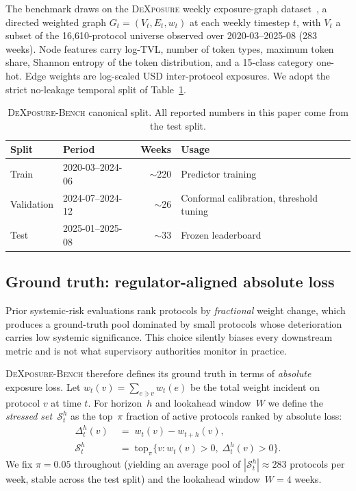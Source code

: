 The benchmark draws on the \textsc{DeXposure} weekly exposure-graph
dataset~\cite{wu2025dexposuredatasetbenchmarksinterprotocol}, a
directed weighted graph $G_t = (V_t, E_t, w_t)$ at each weekly
timestep $t$, with $V_t$ a subset of the 16{,}610-protocol universe
observed over 2020-03--2025-08 (283 weeks).  Node features carry
log-TVL, number of token types, maximum token share, Shannon entropy
of the token distribution, and a 15-class category one-hot.  Edge
weights are log-scaled USD inter-protocol exposures.  We adopt the
strict no-leakage temporal split of Table~\ref{tab:bench-split}.

\begin{table}[t]
\centering
\caption{\textsc{DeXposure-Bench} canonical split.  All reported
numbers in this paper come from the test split.}
\label{tab:bench-split}
\footnotesize
\setlength{\tabcolsep}{6pt}
\begin{tabularx}{\linewidth}{@{}llrX@{}}
\toprule
Split & Period & Weeks & Usage \\
\midrule
Train       & 2020-03--2024-06 & $\sim$220 & Predictor training \\
Validation  & 2024-07--2024-12 & $\sim$26  & Conformal calibration, threshold tuning \\
Test        & 2025-01--2025-08 & $\sim$33  & Frozen leaderboard \\
\bottomrule
\end{tabularx}
\end{table}

\subsection{Ground truth: regulator-aligned absolute loss}
\label{ssec:ground-truth}

Prior systemic-risk evaluations rank protocols by \emph{fractional}
weight change, which produces a ground-truth pool dominated by small
protocols whose deterioration carries low systemic significance.  This
choice silently biases every downstream metric and is not what
supervisory authorities monitor in practice.

\textsc{DeXposure-Bench} therefore defines its ground truth in terms
of \emph{absolute} exposure loss.  Let $w_t(v)=\sum_{e\ni v} w_t(e)$
be the total weight incident on protocol $v$ at time $t$.  For
horizon~$h$ and lookahead window~$W$ we define the \emph{stressed
set}~$\mathcal{S}_t^h$ as the top~$\pi$ fraction of active protocols
ranked by absolute loss:
\begin{equation}
\begin{aligned}
\Delta_t^h(v) &\;=\; w_t(v) - w_{t+h}(v), \\
\mathcal{S}_t^h &\;=\; \mathrm{top}_{\pi}\bigl\{ v : w_t(v) > 0,\; \Delta_t^h(v) > 0 \bigr\}.
\end{aligned}
\label{eq:stressed}
\end{equation}
We fix $\pi = 0.05$ throughout (yielding an average pool of
$|\mathcal{S}_t^h|\approx 283$ protocols per week, stable across the
test split) and the lookahead window~$W=4$ weeks.


